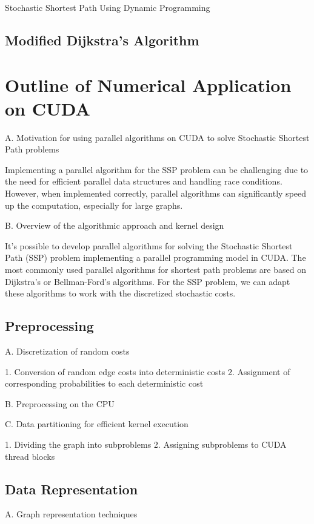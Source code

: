 \documentclass{article}
\begin{document}
\begin{algorithm}[H]

\caption{Stochastic Shortest Path Using Dynamic Programming}
\end{algorithm}

\subsection{Modified Dijkstra's Algorithm}



\section{Outline of Numerical Application on CUDA}


A. Motivation for using parallel algorithms on CUDA to solve Stochastic Shortest Path problems

Implementing a parallel algorithm for the SSP problem can be challenging due to the need for efficient 
parallel data structures and handling race conditions. However, when implemented correctly, parallel algorithms 
can significantly speed up the computation, especially for large graphs.

B. Overview of the algorithmic approach and kernel design

It's possible to develop parallel 
algorithms for solving the Stochastic Shortest Path (SSP) problem implementing a parallel programming model in 
CUDA. The most commonly used parallel algorithms for shortest path problems are based on Dijkstra's or Bellman-Ford's 
algorithms. For the SSP problem, we can adapt these algorithms to work with the discretized stochastic costs.

\subsection{Preprocessing}
A. Discretization of random costs

1. Conversion of random edge costs into deterministic costs
2. Assignment of corresponding probabilities to each deterministic cost

B. Preprocessing on the CPU

C. Data partitioning for efficient kernel execution

1. Dividing the graph into subproblems
2. Assigning subproblems to CUDA thread blocks

\subsection{Data Representation}
A. Graph representation techniques
\end{document}
